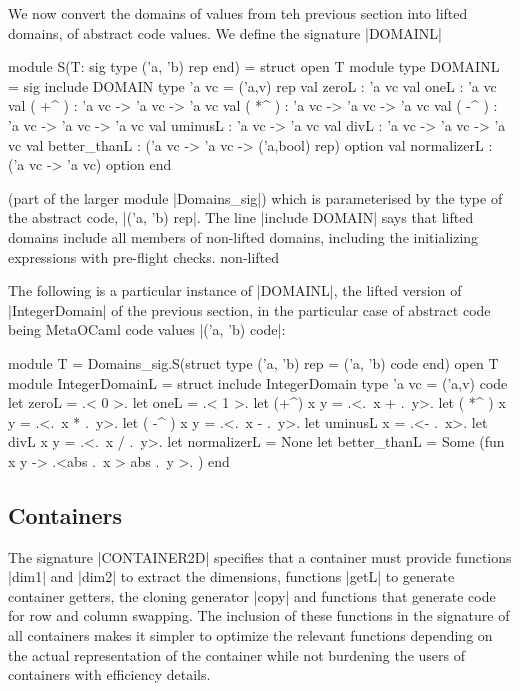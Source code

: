 \documentclass[draft]{elsart}
\begin{document}
We now convert the domains of values from teh previous section into
lifted domains, of abstract code values. We define the signature
|DOMAINL| 
\begin{code}
module S(T: sig type ('a, 'b) rep  end) = struct
open T
module type DOMAINL = sig
  include DOMAIN
  type 'a vc = ('a,v) rep
  val zeroL : 'a vc
  val oneL : 'a vc
  val ( +^ ) : 'a vc -> 'a vc -> 'a vc
  val ( *^ ) : 'a vc -> 'a vc -> 'a vc
  val ( -^ ) : 'a vc -> 'a vc -> 'a vc
  val uminusL : 'a vc -> 'a vc
  val divL : 'a vc -> 'a vc -> 'a vc
  val better_thanL : ('a vc -> 'a vc -> ('a,bool) rep) option
  val normalizerL : ('a vc -> 'a vc) option
end 
\end{code}
(part of the larger module |Domains_sig|) which is parameterised by
the type of the abstract code, |('a, 'b) rep|. The line |include DOMAIN|
says that lifted domains include all members of non-lifted domains,
including the initializing expressions with pre-flight checks.
non-lifted 

The following is a particular instance of |DOMAINL|, the lifted
version of |IntegerDomain| of the previous section, in the particular
case of abstract code being MetaOCaml code values |('a, 'b) code|:
\begin{code}
module T = Domains_sig.S(struct type ('a, 'b) rep = ('a, 'b) code end)
open T
module IntegerDomainL = struct
    include IntegerDomain
    type 'a vc = ('a,v) code
    let zeroL = .< 0 >.  
    let oneL = .< 1 >. 
    let (+^) x y = .<.~x + .~y>. 
    let ( *^ ) x y = .<.~x * .~y>.
    let ( -^ ) x y = .<.~x - .~y>.
    let uminusL x = .<- .~x>.
    let divL x y = .<.~x / .~y>. 
    let normalizerL = None
    let better_thanL = Some (fun x y -> .<abs .~x > abs .~y >. )
end
\end{code}


\subsection{Containers}

The signature |CONTAINER2D| specifies that a container must provide
functions |dim1| and |dim2| to extract the dimensions, functions |getL|
to generate container getters, the cloning
generator |copy| and functions that generate code for row and column
swapping. The inclusion of these functions in the signature of all
containers makes it simpler to optimize the relevant functions
depending on the actual representation of the container while not
burdening the users of containers with efficiency details.
\end{document}
